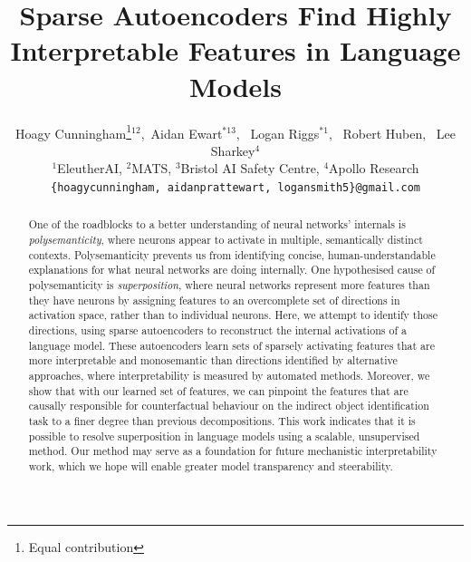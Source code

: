 \documentclass{article} %
\title{\textbf{Sparse Autoencoders Find Highly Interpretable Features in Language Models}}
\author{Hoagy Cunningham\thanks{Equal contribution}\hspace{4pt}$^{1 2}$,\  Aidan Ewart$^{* 1 3}$, \ Logan Riggs$^{* 1}$, \ Robert Huben, \ Lee Sharkey$^{4}$ \\
$^1$EleutherAI, $^2$MATS, $^3$Bristol AI Safety Centre, $^4$Apollo Research \\
\texttt{\{hoagycunningham, aidanprattewart, logansmith5\}@gmail.com}}
\begin{document}
\maketitle

\begin{abstract}

One of the roadblocks to a better understanding of neural networks' internals is \textit{polysemanticity}, where neurons appear to activate in multiple, semantically distinct contexts. Polysemanticity prevents us from identifying concise, human-understandable explanations for what neural networks are doing internally. One hypothesised cause of polysemanticity is \textit{superposition}, where neural networks represent more features than they have neurons by assigning features to an overcomplete set of directions in activation space, rather than to individual neurons. Here, we attempt to identify those directions, using sparse autoencoders to reconstruct the internal activations of a language model. These autoencoders learn sets of sparsely activating features that are more interpretable and monosemantic than directions identified by alternative approaches, where interpretability is measured by automated methods. Moreover, we show that with our learned set of features, we can pinpoint the features that are causally responsible for counterfactual behaviour on the indirect object identification task \citep{wang2022interpretability} to a finer degree than previous decompositions. This work indicates that it is possible to resolve superposition in language models using a scalable, unsupervised method. Our method may serve as a foundation for future mechanistic interpretability work, which we hope will enable greater model transparency and steerability.




\end{abstract}
\end{document}
